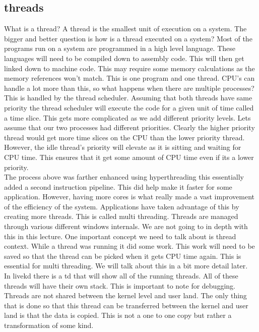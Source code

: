 \documentclass[letterpaper, onecolumn,10pt]{IEEEtran}
\begin{document}
		    \subsection{threads}
		    What is a thread? A thread is the smallest unit of execution on a system. The bigger and better question is how is a thread executed on a system? Most of the programs run on a system are programmed in a high level language. These languages will need to be compiled down to assembly code. This will then get linked down to machine code. This may require some memory calculations as the memory references won't match. This is one program and one thread. CPU's can handle a lot more than this, so what happens when there are multiple processes? This is handled by the thread scheduler. Assuming that both threads have same priority the thread scheduler will execute the code for a given unit of time called a time slice. This gets more complicated as we add different priority levels. Lets assume that our two processes had different priorities. Clearly the higher priority thread would get more time slices on the CPU than the lower priority thread. However, the idle thread's priority will elevate as it is sitting and waiting for CPU time. This ensures that it get some amount of CPU time even if its a lower priority.\\
		    
		    The process above was farther enhanced using hyperthreading this essentially added a second instruction pipeline. This did help make it faster for some application. However, having more cores is what really made a vast improvement of the efficiency of the system. Applications have taken advantage of this by creating more threads. This is called multi threading. Threads are managed through various different windows internals. We are not going to in depth with this in this lecture. One important concept we need to talk about is thread context. While a thread was running it did some work. This work will need to be saved so that the thread can be picked when it gets CPU time again. This is essential for multi threading. We will talk about this in a bit more detail later.\\
		    
		    In livekd there is a td that will show all of the running threads. All of these threads will have their own stack. This is important to note for debugging. Threads are not shared between the kernel level and user land. The only thing that is done so that this thread can be transferred between the kernel and user land is that the data is copied. This is not a one to one copy but rather a transformation of some kind.\\
		    
\end{document}
